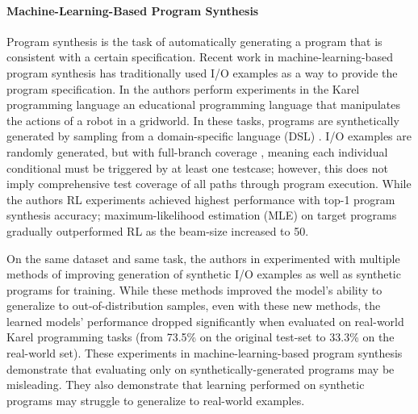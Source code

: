 \documentclass{article}
\begin{document}
\paragraph{Machine-Learning-Based Program Synthesis} Program synthesis is the task of automatically generating a program that is consistent with a certain specification. Recent work in machine-learning-based program synthesis has traditionally used I/O examples as a way to provide the program specification. In \cite{bunel2018leveraging} the authors perform experiments in the Karel programming language \cite{pattis1981karel} an educational programming language that manipulates the actions of a robot in a gridworld.
In these tasks, programs are synthetically generated by sampling from a domain-specific language (DSL) . I/O examples are randomly generated, but with full-branch coverage , meaning each individual conditional must be triggered by at least one  testcase; however, this does not imply comprehensive test coverage of all paths through program execution. While the authors RL experiments achieved highest performance with top-1 program synthesis accuracy; maximum-likelihood estimation (MLE) on target programs gradually outperformed RL as the beam-size increased to 50. 

On the same dataset and same task, the authors in \cite{shin2018synthetic} experimented with multiple methods of improving generation of synthetic I/O examples as well as synthetic programs for training. While these methods improved the model's ability to generalize to out-of-distribution samples, even with these new methods, the learned models' performance dropped significantly when evaluated on real-world Karel programming tasks (from 73.5\% on the original test-set to 33.3\% on the real-world set). These experiments in machine-learning-based program synthesis demonstrate that evaluating only on synthetically-generated programs may be misleading. They also demonstrate that learning performed on synthetic programs may struggle to generalize to real-world examples. 
\end{document}
